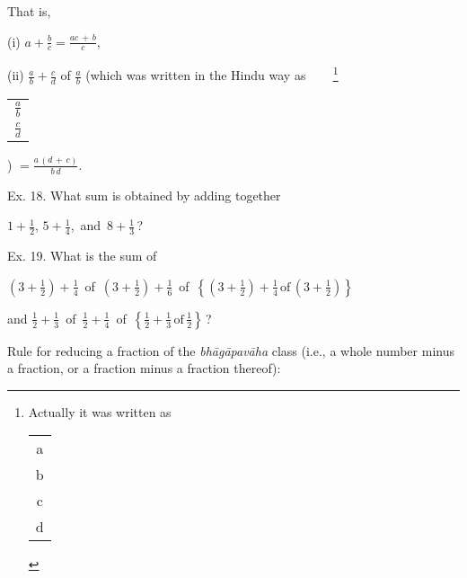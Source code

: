 \documentclass[10pt, openany]{book}
\begin{document}
{{{{{{{{{{{{{{{{{{{{\begin{sloppypar}
That is,
\vspace{1mm}

\hspace{7mm} (i) $a + \frac{b}{c} = \frac{ac\,+\,b}{c} $,
\vspace{1mm}

\hspace{7mm} (ii) $\frac{a}{b} + \frac{c}{d}$ of $\frac{a}{b}$ \bigg(which was written in the Hindu way as~~\,~~\renewcommand{\thefootnote}{\hspace{-4.5mm} 3}\footnote{\hspace{-2mm} \en Actually it was written as\begin{tabular}{c} a\\b\\ c\\d \end{tabular}}\renewcommand*{\arraystretch}{1.2}\begin{tabular}{c} $\frac{a}{b}$ \\ $\frac{c}{d}$ \end{tabular}\bigg) $= \frac{a\,(d\,+\,c)} {b\,d}$.

\renewcommand*{\arraystretch}{0.7}

\newpage

 Ex. 18. What sum is obtained by adding together
\vspace{2mm}

\hspace{15mm} $1+\frac{1}{2}$, \;$5 + \frac{1}{4}$,\, and \,$8+ \frac{1}{3}$\,?
\vspace{4mm}

Ex. 19. What is the sum of
\vspace{3mm}

\hspace{1cm} $\left(3 + \frac{1}{2}\right) + \frac{1}{4}$ \,of\, $\left(3+ \frac{1}{2}\right) + \frac{1}{6}$ \,of\, $\left\lbrace \left(3 + \frac{1}{2}\right) + \frac{1}{4} \,\textrm{of}\, \left(3+ \frac{1}{2}\right)\right\rbrace$
\vspace{3mm}

and \hspace{5mm} $\frac{1}{2} + \frac{1}{3}$ \,of\, $\frac{1}{2} + \frac{1}{4}$ \,of\, $\left\lbrace\frac{1}{2} + \frac{1}{3} \,\textrm{of}\, \frac{1}{2}\right\rbrace$\,?
\vspace{5mm}

\noindent Rule for reducing a fraction of the  \textit{bhāgāpavāha} class (i.e., a
whole number minus a fraction, or a fraction minus a
fraction thereof):
\vspace{3mm}


\end{sloppypar}}}}}}}}}}}}}}}}}}}}}
\end{document}
